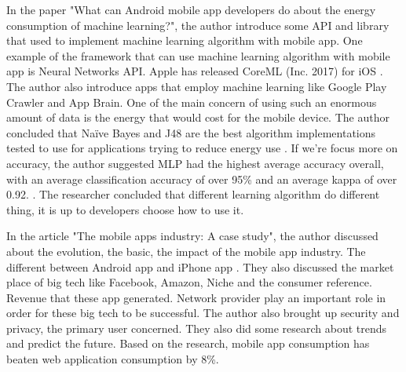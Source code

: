 \documentclass{article}
\begin{document}
\medskip

In the paper "What can Android mobile app developers do about the energy consumption of machine learning?", the author introduce some API and library that used to implement machine learning algorithm with mobile app. One example of the framework that can use machine learning algorithm with mobile app is Neural Networks API. Apple has released CoreML (Inc. 2017) for iOS \cite{mcintosh2019can}. The author also introduce apps that employ machine learning like Google Play Crawler and App Brain. One of the main concern of using such an enormous amount of data is the energy that would cost for the mobile device. The author concluded that Naïve Bayes and J48 are the best algorithm implementations tested to use for applications trying to reduce energy use \cite{mcintosh2019can}. If we're focus more on accuracy, the author suggested MLP had the highest average accuracy overall, with an average classification accuracy of over 95\% and an average kappa of over 0.92. \cite{mcintosh2019can}. The researcher concluded that different learning algorithm do different thing, it is up to developers choose how to use it.


\medskip

In the article "The mobile apps industry: A case study", the author discussed about the evolution, the basic, the impact of the mobile app industry. The different between Android app and iPhone app \cite{rakestraw2013mobile}. They also discussed the market place of big tech like Facebook, Amazon, Niche and the consumer reference. Revenue that these app generated. Network provider play an important role in order for these big tech to be successful. The author also brought up security and privacy, the primary user concerned. They also did some research about trends and predict the future. Based on the research, mobile app consumption has beaten web application consumption by 8\%. 
\newpage
\printbibliography
\end{document}
